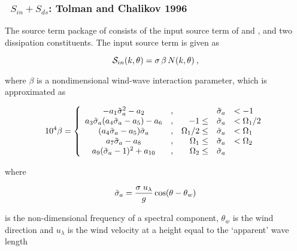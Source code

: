 \vsssub
\subsubsection{~$S_{in} + S_{ds}$:  Tolman and Chalikov 1996} \label{sec:ST2}
\vsssub


\noindent 
The source term package of \cite{tol:JPO96} consists of the input source term
of \cite{art:CB93} and \cite{art:Cha95}, and two dissipation constituents. The
input source term is given as


\begin{equation}
\cS_{in}(k,\theta) = \sigma \, \beta \, N(k,\theta)
\: , \label{eq:CB93_gen} \end{equation}

\noindent
where $\beta$ is a nondimensional wind-wave interaction parameter, which is
approximated as


\begin{equation}
10^4 \beta = \left \{
\begin{array}{ccrcl}
-a_1\toa^2 -a_2          &,&             & \toa & < -1     \\
a_3\toa(a_4\toa-a_5)-a_6 &,&         -1 \leq & \toa & <\Omega_1/2 \\
(a_4\toa-a_5)\toa        &,& \Omega_1/2 \leq & \toa & <\Omega_1   \\
a_7\toa-a_8              &,&   \Omega_1 \leq & \toa & <\Omega_2   \\
a_9(\toa-1)^2+a_{10}     &,&   \Omega_2 \leq & \toa &
\end{array} \right . \label{eq:CB93_beta}
\end{equation}

\noindent
where


\begin{equation}
\toa= \frac{\sigma \; u_{\lambda}}{g} \cos(\theta-\theta_w)
\label{eq:CB93_oma} \end{equation}

\noindent
is the non-dimensional frequency of a spectral component, $\theta_w$ is the
wind direction and $u_{\lambda}$ is the wind velocity at a height equal to the
`apparent' wave length


